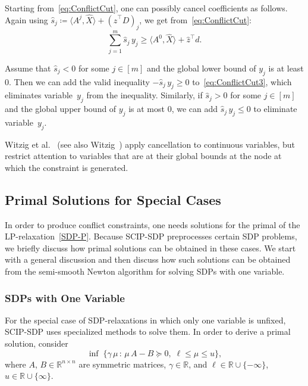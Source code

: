 \documentclass[10pt, a4paper]{article}
\newcommand{\suchthat}{\,:\,}
\newcommand{\define}{\coloneqq}
\newcommand{\skal}[2]{\langle{#1},{#2}\rangle}
\newcommand{\T}{^{\top}}
\newcommand{\R}{\mathds{R}}
\begin{document}
Starting from~\eqref{eq:ConflictCut}, one can possibly cancel coefficients
as follows. Again using
$\hat{s}_j \define \skal{A^j}{\hat{X}} + (\hat{z}\T D)_j$, we get
from~\eqref{eq:ConflictCut}:
\begin{equation}\label{eq:ConflictCut3}
  \sum_{j=1}^m \hat{s}_j\, y_j \geq \skal{A^0}{\hat{X}} + \hat{z}\T d.
\end{equation}

Assume that $\hat{s}_j < 0$ for some $j \in [m]$ and the global lower bound
of $y_j$ is at least 0. Then we can add the valid inequality
$-\hat{s}_j\, y_j \geq 0$ to~\eqref{eq:ConflictCut3}, which eliminates
variable~$y_j$ from the inequality. Similarly, if $\hat{s}_j > 0$ for some
$j \in [m]$ and the global upper bound of $y_j$ is at most 0, we can add
$\hat{s}_j\, y_j \leq 0$ to eliminate variable~$y_j$.

Witzig et al.~\cite{WitBH17} (see also Witzig~\cite{Wit22}) apply
cancellation to continuous variables, but restrict attention to variables
that are at their global bounds at the node at which the constraint is
generated.


\subsection{Primal Solutions for Special Cases}
\label{sec:Primal}

In order to produce conflict constraints, one needs solutions for the
primal of the LP-relaxation~\eqref{SDP-P}. Because SCIP-SDP preprocesses
certain SDP problems, we briefly discuss how primal solutions can be
obtained in these cases. We start with a general discussion and then
discuss how such solutions can be obtained from the semi-smooth Newton
algorithm for solving SDPs with one variable.

\subsubsection{SDPs with One Variable}

For the special case of SDP-relaxations in which only one variable is
unfixed, SCIP-SDP uses specialized methods to solve them. In order to
derive a primal solution, consider
\begin{equation}\label{eq:basic}
  \inf\; \{\gamma\, \mu \suchthat \mu\, A - B \succeq 0,\; \ell \leq \mu \leq u\},
\end{equation}
where $A$, $B \in \R^{n \times n}$ are symmetric matrices, $\gamma \in \R$,
and $\ell \in \R \cup \{-\infty\}$, $u \in \R \cup \{\infty\}$.
\end{document}
